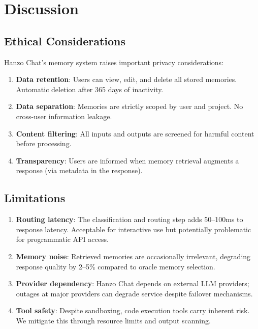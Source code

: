 \section{Discussion}

\label{sec:discussion}

\subsection{Ethical Considerations}

Hanzo Chat's memory system raises important privacy considerations:

\begin{enumerate}[leftmargin=1.4em]
    \item \textbf{Data retention}: Users can view, edit, and delete all stored memories. Automatic deletion after 365 days of inactivity.
    \item \textbf{Data separation}: Memories are strictly scoped by user and project. No cross-user information leakage.
    \item \textbf{Content filtering}: All inputs and outputs are screened for harmful content before processing.
    \item \textbf{Transparency}: Users are informed when memory retrieval augments a response (via metadata in the response).
\end{enumerate}

\subsection{Limitations}

\begin{enumerate}[leftmargin=1.4em]
    \item \textbf{Routing latency}: The classification and routing step adds 50--100ms to response latency. Acceptable for interactive use but potentially problematic for programmatic API access.
    \item \textbf{Memory noise}: Retrieved memories are occasionally irrelevant, degrading response quality by 2--5\% compared to oracle memory selection.
    \item \textbf{Provider dependency}: Hanzo Chat depends on external LLM providers; outages at major providers can degrade service despite failover mechanisms.
    \item \textbf{Tool safety}: Despite sandboxing, code execution tools carry inherent risk. We mitigate this through resource limits and output scanning.
\end{enumerate}

